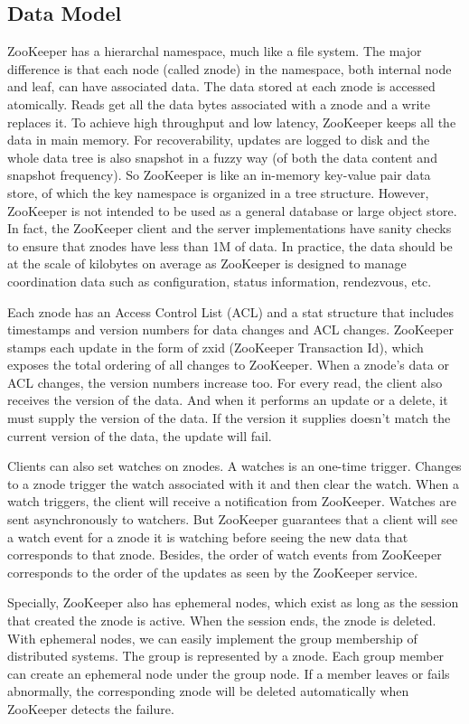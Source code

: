 \documentclass[11pt]{book}
\begin{document}
\subsection{Data Model}
ZooKeeper has a hierarchal namespace, much like a file system. The major difference is that each node (called znode) in the namespace, both internal node and leaf, can have associated data. The data stored at each znode is accessed atomically. Reads get all the data bytes associated with a znode and a write replaces it. To achieve high throughput and low latency, ZooKeeper keeps all the data in main memory. For recoverability, updates are logged to disk and the whole data tree is also snapshot in a fuzzy way (of both the data content and snapshot frequency). So ZooKeeper is like an in-memory key-value pair data store, of which the key namespace is organized in a tree structure. However, ZooKeeper is not intended to be used as a general database or large object store. In fact, the ZooKeeper client and the server implementations have sanity checks to ensure that znodes have less than 1M of data. In practice, the data should be at the scale of kilobytes on average as ZooKeeper is designed to manage coordination data such as configuration, status information, rendezvous, etc. 

Each znode has an Access Control List (ACL) and a stat structure that includes timestamps and version numbers for data changes and ACL changes. ZooKeeper stamps each update in the form of zxid (ZooKeeper Transaction Id), which exposes the total ordering of all changes to ZooKeeper. When a znode's data or ACL changes, the version numbers increase too. For every read, the client also receives the version of the data. And when it performs an update or a delete, it must supply the version of the data. If the version it supplies doesn't match the current version of the data, the update will fail.

Clients can also set watches on znodes. A watches is an one-time trigger. Changes to a znode trigger the watch associated with it and then clear the watch. When a watch triggers, the client will receive a notification from ZooKeeper. Watches are sent asynchronously to watchers. But ZooKeeper guarantees that a client will see a watch event for a znode it is watching before seeing the new data that corresponds to that znode. Besides, the order of watch events from ZooKeeper corresponds to the order of the updates as seen by the ZooKeeper service.

Specially, ZooKeeper also has ephemeral nodes, which exist as long as the session that created the znode is active. When the session ends, the znode is deleted. With ephemeral nodes, we can easily implement the group membership of distributed systems. The group is represented by a znode. Each group member can create an ephemeral node under the group node. If a member leaves or fails abnormally, the corresponding znode will be deleted automatically when ZooKeeper detects the failure.
\end{document}
